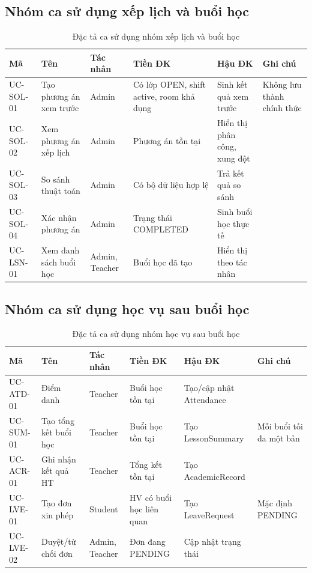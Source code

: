 \documentclass[../DoAn.tex]{subfiles}
\begin{document}
\subsection{Nhóm ca sử dụng xếp lịch và buổi học}

\begin{table}[H]
\centering
\caption{Đặc tả ca sử dụng nhóm xếp lịch và buổi học}
\label{table:bang2.11}
\scriptsize
\begin{tabular}{|l|p{2.5cm}|l|p{2.5cm}|p{2.5cm}|p{2cm}|}
\hline
\textbf{Mã} & \textbf{Tên} & \textbf{Tác nhân} & \textbf{Tiền ĐK} & \textbf{Hậu ĐK} & \textbf{Ghi chú} \\ \hline
UC-SOL-01 & Tạo phương án xem trước & Admin & Có lớp OPEN, shift active, room khả dụng & Sinh kết quả xem trước & Không lưu thành chính thức \\ \hline
UC-SOL-02 & Xem phương án xếp lịch & Admin & Phương án tồn tại & Hiển thị phân công, xung đột &  \\ \hline
UC-SOL-03 & So sánh thuật toán & Admin & Có bộ dữ liệu hợp lệ & Trả kết quả so sánh &  \\ \hline
UC-SOL-04 & Xác nhận phương án & Admin & Trạng thái COMPLETED & Sinh buổi học thực tế &  \\ \hline
UC-LSN-01 & Xem danh sách buổi học & Admin, Teacher & Buổi học đã tạo & Hiển thị theo tác nhân &  \\ \hline
\end{tabular}
\end{table}

\subsection{Nhóm ca sử dụng học vụ sau buổi học}

\begin{table}[H]
\centering
\caption{Đặc tả ca sử dụng nhóm học vụ sau buổi học}
\label{table:bang2.12}
\scriptsize
\begin{tabular}{|l|p{2.5cm}|l|p{2.5cm}|p{2.5cm}|p{2cm}|}
\hline
\textbf{Mã} & \textbf{Tên} & \textbf{Tác nhân} & \textbf{Tiền ĐK} & \textbf{Hậu ĐK} & \textbf{Ghi chú} \\ \hline
UC-ATD-01 & Điểm danh & Teacher & Buổi học tồn tại & Tạo/cập nhật Attendance &  \\ \hline
UC-SUM-01 & Tạo tổng kết buổi học & Teacher & Buổi học tồn tại & Tạo LessonSummary & Mỗi buổi tối đa một bản \\ \hline
UC-ACR-01 & Ghi nhận kết quả HT & Teacher & Tổng kết tồn tại & Tạo AcademicRecord &  \\ \hline
UC-LVE-01 & Tạo đơn xin phép & Student & HV có buổi học liên quan & Tạo LeaveRequest & Mặc định PENDING \\ \hline
UC-LVE-02 & Duyệt/từ chối đơn & Admin, Teacher & Đơn đang PENDING & Cập nhật trạng thái &  \\ \hline
\end{tabular}
\end{table}
\end{document}

